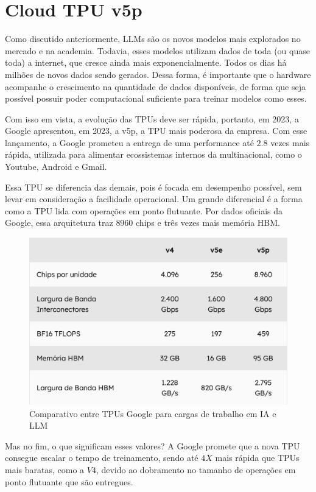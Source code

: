 \documentclass{article}
\begin{document}
\section{Cloud TPU v5p}

Como discutido anteriormente, LLMs são os novos modelos mais explorados no mercado e na academia. Todavia, esses modelos utilizam dados de toda (ou quase toda) a internet, que cresce ainda mais exponencialmente. Todos os dias há milhões de novos dados sendo gerados. Dessa forma, é importante que o hardware acompanhe o crescimento na quantidade de dados disponíveis, de forma que seja possível possuir poder computacional suficiente para treinar modelos como esses.

Com isso em vista, a evolução das TPUs deve ser rápida, portanto, em 2023, a Google apresentou, em 2023, a v5p, a TPU mais poderosa da empresa. Com esse lançamento, a Google prometeu a entrega de uma performance até $2.8$ vezes mais rápida, utilizada para alimentar ecossistemas internos da multinacional, como o Youtube, Android e Gmail.

Essa TPU se diferencia das demais, pois é focada em desempenho possível, sem levar em consideração a facilidade operacional. Um grande diferencial é a forma como a TPU lida com operações em ponto flutuante. Por dados oficiais da Google, essa arquitetura traz $8960$ chips e três vezes mais memória HBM.

\begin{figure}[h]
\includegraphics[scale=0.5]{comparativo-tpus}
\centering
\caption{Comparativo entre TPUs Google para cargas de trabalho em IA e LLM}
\end{figure}

Mas no fim, o que significam esses valores? A Google promete que a nova TPU consegue escalar o tempo de treinamento, sendo até $4X$ mais rápida que TPUs mais baratas, como a $V4$, devido ao dobramento no tamanho de operações em ponto flutuante que são entregues.
\end{document}
